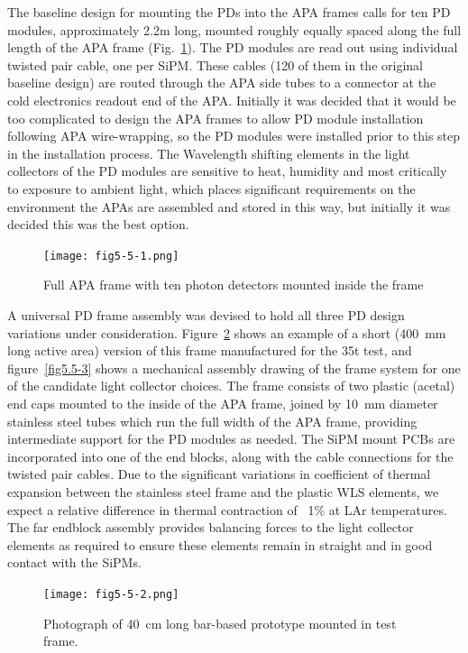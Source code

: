 The baseline design for mounting the PDs into the APA frames calls for
ten PD modules, approximately 2.2m long, mounted roughly equally
spaced along the full length of the APA frame (Fig.~\ref{fig5.5-1}).  The
PD modules are read out using individual twisted pair cable, one per
SiPM.  These cables (120 of them in the original baseline design) are
routed through the APA side tubes to a connector at the cold
electronics readout end of the APA.  Initially it was decided that it
would be too complicated to design the APA frames to allow PD module
installation following APA wire-wrapping, so the PD modules were
installed prior to this step in the installation process.  The
Wavelength shifting elements in the light collectors of the PD modules
are sensitive to heat, humidity and most critically to exposure to
ambient light, which places significant requirements on the
environment the APAs are assembled and stored in this way, but
initially it was decided this was the best option.

\begin{figure}[h!]
  \centering
  \texttt{[image: fig5-5-1.png]}
\caption{Full APA frame with ten photon detectors mounted
  inside the frame}
\label{fig5.5-1}
\end{figure}

A universal PD frame assembly was devised to hold all three PD design
variations under consideration.  Figure~\ref{fig5.5-2} shows an example of a
short (400~mm long active area) version of this frame manufactured for
the 35t test, and figure~\ref{fig5.5-3} shows a mechanical assembly drawing of
the frame system for one of the candidate light collector choices.
The frame consists of two plastic (acetal) end caps mounted to the
inside of the APA frame, joined by 10~mm diameter stainless steel tubes
which run the full width of the APA frame, providing intermediate
support for the PD modules as needed.  The SiPM mount PCBs are
incorporated into one of the end blocks, along with the cable
connections for the twisted pair cables.  Due to the significant
variations in coefficient of thermal expansion between the stainless
steel frame and the plastic WLS elements, we expect a relative
difference in thermal contraction of ~1\% at LAr temperatures.  The
far endblock assembly provides balancing forces to the light collector
elements as required to ensure these elements remain in straight and
in good contact with the SiPMs.

\begin{figure}[h!]
  \centering
  \texttt{[image: fig5-5-2.png]}
\caption{Photograph of 40~cm long bar-based prototype mounted in test frame.}
\label{fig5.5-2}
\end{figure}

